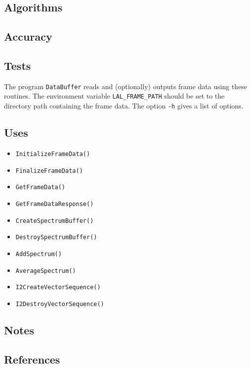 \documentclass{article}
\begin{document}
\subsection{Algorithms}

\subsection{Accuracy}

\subsection{Tests}

The program \texttt{DataBuffer} reads and (optionally) outputs frame data
using these routines.  The environment variable \texttt{LAL\_FRAME\_PATH}
should be set to the directory path containing the frame data.  The option
\texttt{-h} gives a list of options.

\subsection{Uses}

\begin{itemize}
\item\texttt{InitializeFrameData()}
\item\texttt{FinalizeFrameData()}
\item\texttt{GetFrameData()}
\item\texttt{GetFrameDataResponse()}
\item\texttt{CreateSpectrumBuffer()}
\item\texttt{DestroySpectrumBuffer()}
\item\texttt{AddSpectrum()}
\item\texttt{AverageSpectrum()}
\item\texttt{I2CreateVectorSequence()}
\item\texttt{I2DestroyVectorSequence()}
\end{itemize}

\subsection{Notes}

\subsection{References}
\end{document}
